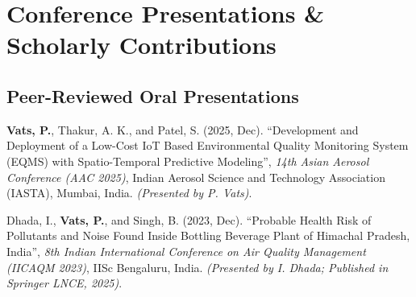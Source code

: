 \documentclass[10pt,a4paper]{article}
\begin{document}
\section*{Conference Presentations \& Scholarly Contributions}

\subsection*{Peer-Reviewed Oral Presentations}
\begin{enumerate}[leftmargin=18pt, label={[\arabic*]}]
    \item \textbf{Vats, P.}, Thakur, A. K., and Patel, S. (2025, Dec). ``Development and Deployment of a Low-Cost IoT Based Environmental Quality Monitoring System (EQMS) with Spatio-Temporal Predictive Modeling'', \textit{14th Asian Aerosol Conference (AAC 2025)}, Indian Aerosol Science and Technology Association (IASTA), Mumbai, India. \textit{(Presented by P. Vats)}.
    \item Dhada, I., \textbf{Vats, P.}, and Singh, B. (2023, Dec). ``Probable Health Risk of Pollutants and Noise Found Inside Bottling Beverage Plant of Himachal Pradesh, India'', \textit{8th Indian International Conference on Air Quality Management (IICAQM 2023)}, IISc Bengaluru, India. \textit{(Presented by I. Dhada; Published in Springer LNCE, 2025)}.
\end{enumerate}
\end{document}
